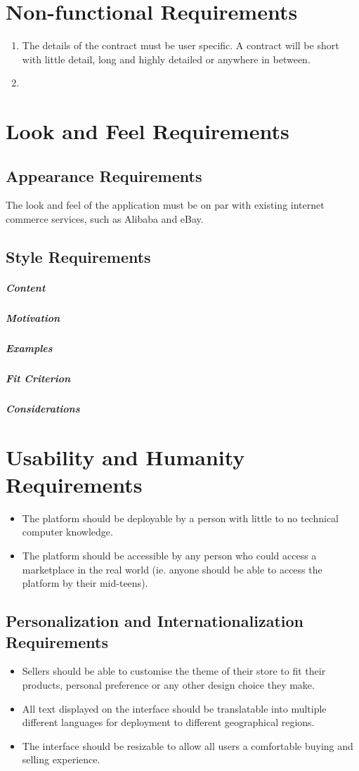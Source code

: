 \documentclass{article}
\begin{document}
\section*{Non-functional Requirements}
\begin{enumerate}
\item
The details of the contract must be user specific. A contract will be short with little detail, long and highly detailed or anywhere in between.

\item

\end{enumerate}
\section{Look and Feel Requirements}
\subsection{Appearance Requirements}
The look and feel of the application must be on par with existing internet commerce services, such as Alibaba and eBay. 

\subsection{Style Requirements}
\subparagraph{Content}
\subparagraph{Motivation}
\subparagraph{Examples}
\subparagraph{Fit Criterion}
\subparagraph{Considerations}

\section{Usability and Humanity Requirements}
\begin{itemize}
\item
The platform should be deployable by a person with little to no technical computer knowledge.

\item
The platform should be accessible by any person who could access a marketplace in the real world (ie. anyone should be able to access the platform by their mid-teens).
\end{itemize}

\subsection{Personalization and Internationalization Requirements}
\begin{itemize}
\item
Sellers should be able to customise the theme of their store to fit their products, personal preference or any other design choice they make. 

\item
All text displayed on the interface should be translatable into multiple different languages for deployment to different geographical regions.

\item
The interface should be resizable to allow all users a comfortable buying and selling experience.
\end{itemize}
\end{document}
